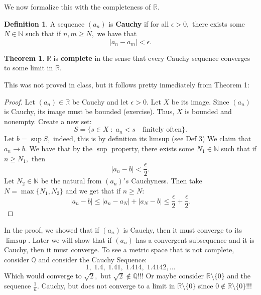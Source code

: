 \documentclass[10pt, oneside]{article}
\newcommand{\bbR}{\mathbb{R}}
\newcommand{\bbN}{\mathbb{N}}
\newcommand{\bbQ}{\mathbb{Q}}
\theoremstyle{definition}
\newtheorem{thm}{Theorem}
\newtheorem{defn}{Definition}
\begin{document}
We now formalize this with the completeness of $\bbR.$
\begin{defn}
    A sequence $(a_n)$ is \textbf{Cauchy} if for all $\epsilon>0,$ there exists some $N \in \bbN$ such that if $n, m \geq N,$ we have that 
    \[|a_n - a_m|< \epsilon.\]
\end{defn}
\begin{thm}
    $\bbR$ is \textbf{complete} in the sense that every Cauchy sequence converges to some limit in $\bbR.$
\end{thm}
This was not proved in class, but it follows pretty inmediately from Theorem 1:
\begin{proof}
    Let $(a_n) \in \bbR$ be Cauchy and let $\epsilon>0$. Let $X$ be its image. Since $(a_n)$ is Cauchy, its image must be bounded (exercise). Thus, $X$ is bounded and nonempty. Create a new set:
    \[S = \{s \in X \; : \; a_n < s \quad \text{finitely often}\}.\] Let $b = \sup S,$ indeed, this is by definition its limsup (see Def 3) We claim that $a_n \to b.$ We have that by the $\sup$ property, there exists some $N_1 \in \bbN$ such that if $n\geq N_1,$ then 
    \[|a_n - b|< \frac{\epsilon}{2}.\] Let $N_2\in \bbN$ be the natural from $(a_n)'s$ Cauchyness. Then take $N = \max\{N_1, N_2\}$ and we get that if $n\geq N:$
    \[|a_n - b| \leq |a_n - a_N| + |a_N - b|\leq \frac{\epsilon}{2} + \frac{\epsilon}{2}.\]
\end{proof}
In the proof, we showed that if $(a_n)$ is Cauchy, then it must converge to its $\limsup$. Later we will show that if $(a_n)$ has a convergent subsequence and it is Cauchy, then it must converge.
To see a metric space that is not complete, consider $\bbQ$ and consider the Cauchy Sequence:
\[1, \; 1.4, \; 1.41, \; 1.414, \; 1.4142, \dots\] Which would converge to $\sqrt{2},$ but $\sqrt{2}\notin \bbQ!!!$ Or maybe consider $\bbR\setminus\{0\}$ and the sequence $\frac{1}{n}.$ Cauchy, but does not converge to a limit in $\bbR\setminus\{0\}$ since $0\notin \bbR\setminus\{0\}!!!$
\end{document}
